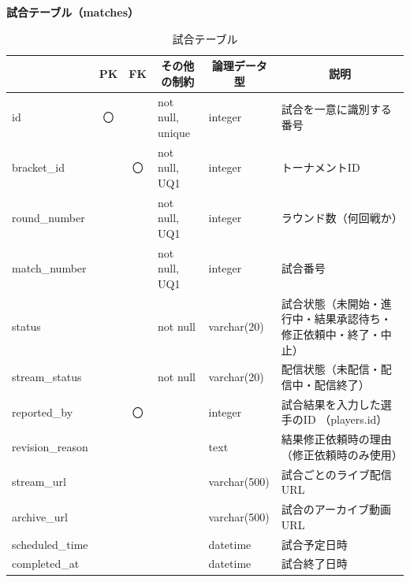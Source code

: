 \noindent\textbf{試合テーブル（matches）}
\begin{table}[H]
    \centering
    \caption{試合テーブル}
    \label{tab:matches_table}
    \begin{tabularx}{\linewidth}{|l|c|c|l|l|X|}
        \hline
        \rowcolor{tableblue}
        \multicolumn{1}{|c|}{カラム名} & \multicolumn{1}{c|}{PK} & \multicolumn{1}{c|}{FK} & \multicolumn{1}{c|}{その他の制約} & \multicolumn{1}{c|}{論理データ型} & \multicolumn{1}{c|}{説明} \\ \hline
        id & 〇 & & not null, unique & integer & 試合を一意に識別する番号 \\ \hline
        bracket\_id & & 〇 & not null, UQ1 & integer & トーナメントID \\ \hline
        round\_number & & & not null, UQ1 & integer & ラウンド数（何回戦か） \\ \hline
        match\_number & & & not null, UQ1 & integer & 試合番号 \\ \hline
        status & & & not null & varchar(20) & 試合状態（未開始・進行中・結果承認待ち・修正依頼中・終了・中止） \\ \hline
        stream\_status & & & not null & varchar(20) & 配信状態（未配信・配信中・配信終了） \\ \hline
        reported\_by & & 〇 & & integer & 試合結果を入力した選手のID \newline（players.id） \\ \hline
        revision\_reason & & & & text & 結果修正依頼時の理由 \newline（修正依頼時のみ使用） \\ \hline
        stream\_url & & & & varchar(500) & 試合ごとのライブ配信URL \\ \hline
        archive\_url & & & & varchar(500) & 試合のアーカイブ動画URL \\ \hline
        scheduled\_time & & & & datetime & 試合予定日時 \\ \hline
        completed\_at & & & & datetime & 試合終了日時 \\ \hline
    \end{tabularx}
\end{table}

